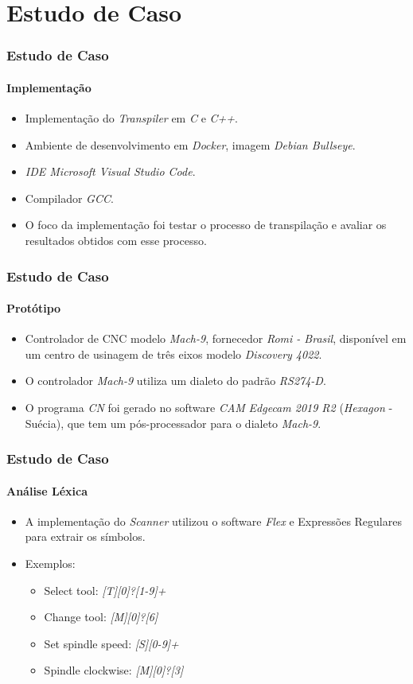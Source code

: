 \documentclass[aspectratio=169]{beamer}
\begin{document}
{\section{Estudo de Caso}

\begin{frame}
  \frametitle{Estudo de Caso}
  \framesubtitle{Implementação}

  \begin{itemize}
    \item Implementação do \emph{Transpiler} em \emph{C} e \emph{C++}.
    \item Ambiente de desenvolvimento em \emph{Docker}, 
          imagem \emph{Debian Bullseye}.
    \item \emph{IDE Microsoft Visual Studio Code}.
    \item Compilador \emph{GCC}.
    \item O foco da implementação foi testar o processo de transpilação 
          e avaliar os resultados obtidos com esse processo.
  \end{itemize}

  \end{frame}


\begin{frame}
  \frametitle{Estudo de Caso}
  \framesubtitle{Protótipo}

  \begin{itemize}
    \item Controlador de CNC modelo \emph{Mach-9}, fornecedor 
          \emph{Romi - Brasil}, disponível em um centro de usinagem de
           três eixos modelo \emph{Discovery 4022}.
    \item O controlador \emph{Mach-9} utiliza um dialeto do padrão 
          \emph{RS274-D}.
    \item O programa \emph{CN} foi gerado no software \emph{CAM} 
          \emph{Edgecam 2019 R2} (\emph{Hexagon} - Suécia), que tem um 
          pós-processador para o dialeto \emph{Mach-9}.
  \end{itemize}

\end{frame}


\begin{frame}
  \frametitle{Estudo de Caso}
  \framesubtitle{Análise Léxica}
  \begin{itemize}
    \item A implementação do \emph{Scanner} utilizou o software 
          \emph{Flex} e Expressões Regulares para extrair os símbolos.
    \item Exemplos:
      \begin{itemize}
        \item Select tool: \emph{[T][0]?[1-9]+}
        \item Change tool: \emph{[M][0]?[6]}
        \item Set spindle speed: \emph{[S][0-9]+}
        \item Spindle clockwise: \emph{[M][0]?[3]}
      \end{itemize}  
  \end{itemize}


\end{frame}}
\end{document}
